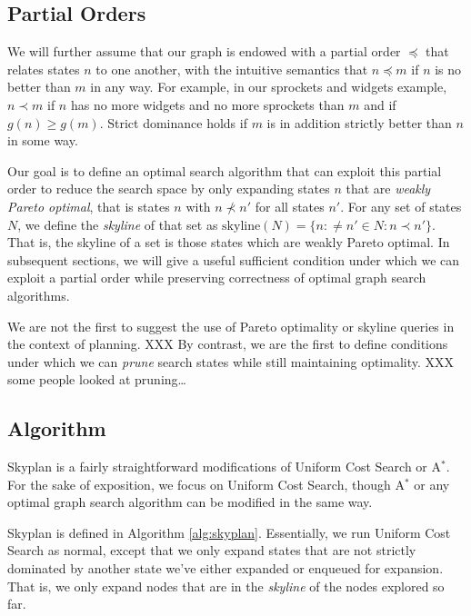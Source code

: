 \documentclass[letterpaper]{article}
\theoremstyle{plain} \newtheorem{theorem}{Theorem} \newtheorem{proposition}{Proposition} \newtheorem{lemma}{Lemma}
\theoremstyle{definition} \newtheorem{definition}{Definition} \newtheorem{conjecture}{Conjecture} \newtheorem*{example}{Example}
\theoremstyle{remark} \newtheorem*{remark}{Remark} \newtheorem*{note}{Note} \newtheorem{case}{Case}
\begin{document}
\subsection{Partial Orders}

We will further assume that our graph is endowed with a partial order $\preceq$
that relates states $n$ to one another, with the intuitive semantics that
$n \preceq m$ if $n$ is no better than $m$ in any way. For example, in
our sprockets and widgets example, $n \prec m$ if $n$ has no more widgets and
no more sprockets than $m$ and if $g(n) \ge g(m)$. Strict dominance
holds if $m$ is in addition strictly better than $n$ in some way.

Our goal is to define an optimal search algorithm that can exploit
this partial order to reduce the search space by only expanding
states $n$ that are \textit{weakly Pareto optimal}, that is states
$n$ with $n \nprec n'$ for all states $n'$. For any set of states
$N$, we define the \textit{skyline} of that set as
$\textrm{skyline}(N)=\{n: \ne n' \in N: n \prec n'\}$. That is, the
skyline of a set is those states which are weakly Pareto optimal.
In subsequent sections, we will give a useful sufficient condition
under which we can exploit a partial order while preserving correctness
of optimal graph search algorithms.

We are not the first to suggest the use of Pareto optimality or skyline queries
in the context of planning. XXX By contrast, we are the first to define conditions
under which we can \textit{prune} search states while still maintaining optimality.
XXX some people looked at pruning\dots


\subsection{Algorithm}

Skyplan is a fairly straightforward modifications of Uniform
Cost Search or A$^*$. For the sake of exposition, we focus on Uniform Cost
Search, though A$^*$ or any optimal graph search algorithm can
be modified in the same way.

Skyplan is defined in Algorithm \ref{alg:skyplan}. Essentially, we run Uniform Cost Search as normal, except that 
we only expand states that are not strictly dominated by another
state we've either expanded or enqueued for expansion. That is, we only expand nodes that are in the \textit{skyline}
of the nodes explored so far.
\end{document}
